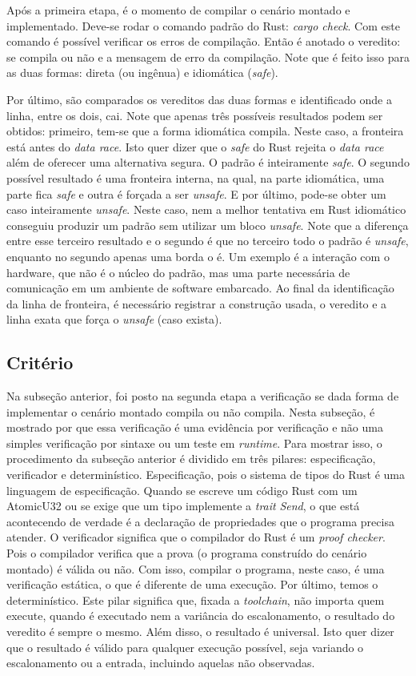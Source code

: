 Após a primeira etapa, é o momento de compilar o cenário montado e implementado. Deve-se rodar o comando padrão do Rust: \textit{cargo check}. Com este comando é possível verificar os erros de compilação. Então é anotado o veredito: se compila ou não e a mensagem de erro da compilação. Note que é feito isso para as duas formas: direta (ou ingênua) e idiomática (\textit{safe}).

Por último, são comparados os vereditos das duas formas e identificado onde a linha, entre os dois, cai. Note que apenas três possíveis resultados podem ser obtidos: primeiro, tem-se que a forma idiomática compila. Neste caso, a fronteira está antes do \textit{data race}. Isto quer dizer que o \textit{safe} do Rust rejeita o \textit{data race} além de oferecer uma alternativa segura. O padrão é inteiramente \textit{safe}. O segundo possível resultado é uma fronteira interna, na qual, na parte idiomática, uma parte fica \textit{safe} e outra é forçada a ser \textit{unsafe}. E por último, pode-se obter um caso inteiramente \textit{unsafe}. Neste caso, nem a melhor tentativa em Rust idiomático conseguiu produzir um padrão sem utilizar um bloco \textit{unsafe}. Note que a diferença entre esse terceiro resultado e o segundo é que no terceiro todo o padrão é \textit{unsafe}, enquanto no segundo apenas uma borda o é. Um exemplo é a interação com o hardware, que não é o núcleo do padrão, mas uma parte necessária de comunicação em um ambiente de software embarcado. Ao final da identificação da linha de fronteira, é necessário registrar a construção usada, o veredito e a linha exata que força o \textit{unsafe} (caso exista).

\subsection{Critério}
\label{subsec:unsafe-criteria}

Na subseção anterior, foi posto na segunda etapa a verificação se dada forma de implementar o cenário montado compila ou não compila. Nesta subseção, é mostrado por que essa verificação é uma evidência por verificação e não uma simples verificação por sintaxe ou um teste em \textit{runtime}. Para mostrar isso, o procedimento da subseção anterior é dividido em três pilares: especificação, verificador e determinístico. Especificação, pois o sistema de tipos do Rust é uma linguagem de especificação. Quando se escreve um código Rust com um AtomicU32 ou se exige que um tipo implemente a \textit{trait} \textit{Send}, o que está acontecendo de verdade é a declaração de propriedades que o programa precisa atender. O verificador significa que o compilador do Rust é um \textit{proof checker}. Pois o compilador verifica que a prova (o programa construído do cenário montado) é válida ou não. Com isso, compilar o programa, neste caso, é uma verificação estática, o que é diferente de uma execução. Por último, temos o determinístico. Este pilar significa que, fixada a \textit{toolchain}, não importa quem execute, quando é executado nem a variância do escalonamento, o resultado do veredito é sempre o mesmo. Além disso, o resultado é universal. Isto quer dizer que o resultado é válido para qualquer execução possível, seja variando o escalonamento ou a entrada, incluindo aquelas não observadas.


